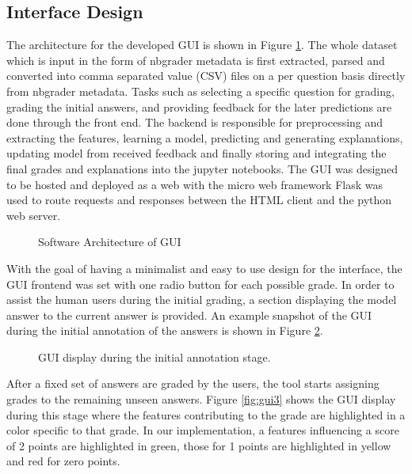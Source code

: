 \documentclass[letterpaper, 10 pt, conference]{ieeeconf}  %
\begin{document}
\subsection{Interface Design}

The architecture for the developed GUI is shown in Figure \ref{fig:arch}. The whole dataset which is input in the form of nbgrader metadata is first extracted, parsed and converted into comma separated value (CSV) files on a per question basis directly from nbgrader metadata. Tasks such as selecting a specific question for grading, grading the initial answers, and providing feedback for the later predictions are done through the front end. The backend is responsible for preprocessing and extracting the features, learning a model, predicting and generating explanations, updating model from received feedback and finally storing and integrating the final grades and explanations into the jupyter notebooks. The GUI was designed to be hosted and deployed as a web with the micro web framework Flask was used to route requests and responses between the HTML client and the python web server.
\begin{figure}[H]
\caption{Software Architecture of GUI}
\label{fig:arch}
\end{figure}
With the goal of having a minimalist and easy to use design for the interface, the GUI frontend was set with one radio button for each possible grade. In order to assist the human users during the initial grading, a section displaying the model answer to the current answer is provided. An example snapshot of the GUI during the initial annotation of the answers is shown in Figure \ref{fig:gui2}.
\begin{figure}[H]
\caption{GUI display during the initial annotation stage.}
\label{fig:gui2}
\end{figure}
After a fixed set of answers are graded by the users, the tool starts assigning grades to the remaining unseen answers. Figure \ref{fig:gui3} shows the GUI display during this stage where the features contributing to the grade are highlighted in a color specific to that grade. In our implementation, a features influencing a score of 2 points are highlighted in green, those for 1 points are highlighted in yellow and red for zero points.
\end{document}
